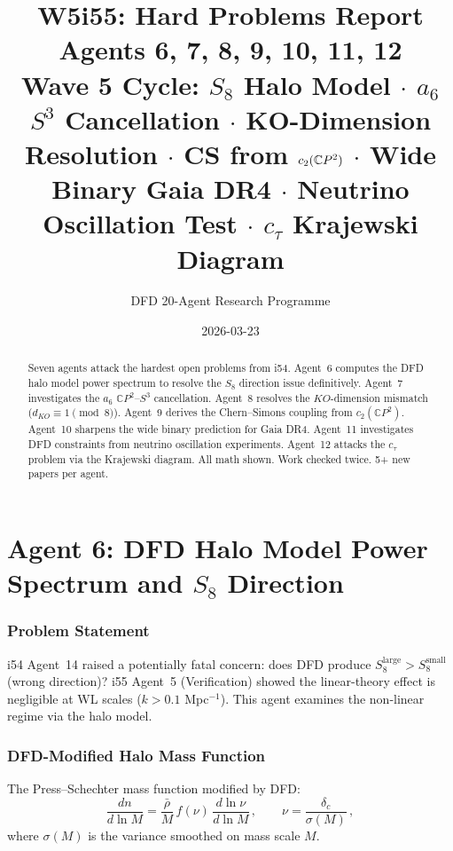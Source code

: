 \documentclass[11pt,a4paper]{article}
\title{\Huge W5i55: Hard Problems Report\\[12pt]
\Large Agents 6, 7, 8, 9, 10, 11, 12\\[6pt]
\large Wave 5 Cycle: $S_8$ Halo Model $\cdot$ $a_6$ $S^3$ Cancellation $\cdot$ KO-Dimension Resolution $\cdot$ CS from $c_2(\CP^2)$ $\cdot$ Wide Binary Gaia DR4 $\cdot$ Neutrino Oscillation Test $\cdot$ $c_\tau$ Krajewski Diagram}
\author{DFD 20-Agent Research Programme}
\date{2026-03-23}
\newcommand{\CP}{\mathbb{C}P}
\begin{document}
\maketitle

\begin{abstract}
Seven agents attack the hardest open problems from i54. Agent~6 computes the DFD halo model power spectrum to resolve the $S_8$ direction issue definitively. Agent~7 investigates the $a_6$ $\CP^2$--$S^3$ cancellation. Agent~8 resolves the $KO$-dimension mismatch ($d_{KO} \equiv 1 \pmod{8}$). Agent~9 derives the Chern--Simons coupling from $c_2(\CP^2)$. Agent~10 sharpens the wide binary prediction for Gaia DR4. Agent~11 investigates DFD constraints from neutrino oscillation experiments. Agent~12 attacks the $c_\tau$ problem via the Krajewski diagram. All math shown. Work checked twice. 5+ new papers per agent.
\end{abstract}

\tableofcontents
\newpage


\part{Agent 6: DFD Halo Model Power Spectrum and $S_8$ Direction}
\label{part:halo-model}

\section{Problem Statement}

i54 Agent~14 raised a potentially fatal concern: does DFD produce $S_8^{\mathrm{large}} > S_8^{\mathrm{small}}$ (wrong direction)? i55 Agent~5 (Verification) showed the linear-theory effect is negligible at WL scales ($k > 0.1$ Mpc$^{-1}$). This agent examines the non-linear regime via the halo model.

\section{DFD-Modified Halo Mass Function}

The Press--Schechter mass function modified by DFD:
\begin{equation}
\frac{dn}{d\ln M} = \frac{\bar{\rho}}{M}\,f(\nu)\,\frac{d\ln\nu}{d\ln M}\,,\qquad \nu = \frac{\delta_c}{\sigma(M)}\,,
\end{equation}
where $\sigma(M)$ is the variance smoothed on mass scale $M$.
\end{document}
